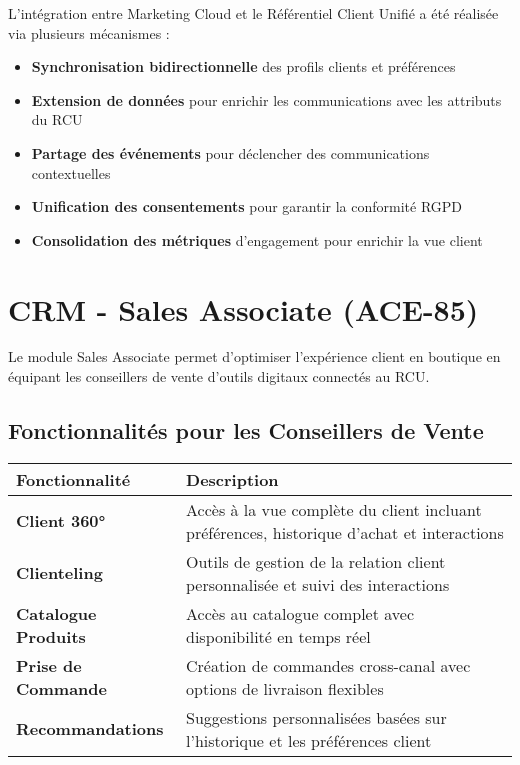 L'intégration entre Marketing Cloud et le Référentiel Client Unifié a été réalisée via plusieurs mécanismes :

\begin{itemize}
    \item \textbf{Synchronisation bidirectionnelle} des profils clients et préférences
    \item \textbf{Extension de données} pour enrichir les communications avec les attributs du RCU
    \item \textbf{Partage des événements} pour déclencher des communications contextuelles
    \item \textbf{Unification des consentements} pour garantir la conformité RGPD
    \item \textbf{Consolidation des métriques} d'engagement pour enrichir la vue client
\end{itemize}

\section{CRM - Sales Associate (ACE-85)}

Le module Sales Associate permet d'optimiser l'expérience client en boutique en équipant les conseillers de vente d'outils digitaux connectés au RCU.

\subsection{Fonctionnalités pour les Conseillers de Vente}

\begin{center}
\begin{tabular}{|>{\bfseries}p{4cm}|p{9.5cm}|}
\hline
\rowcolor{lightblue} Fonctionnalité & Description \\
\hline
Client 360° & Accès à la vue complète du client incluant préférences, historique d'achat et interactions \\
\hline
Clienteling & Outils de gestion de la relation client personnalisée et suivi des interactions \\
\hline
Catalogue Produits & Accès au catalogue complet avec disponibilité en temps réel \\
\hline
Prise de Commande & Création de commandes cross-canal avec options de livraison flexibles \\
\hline
Recommandations & Suggestions personnalisées basées sur l'historique et les préférences client \\
\hline
\end{tabular}
\end{center}

